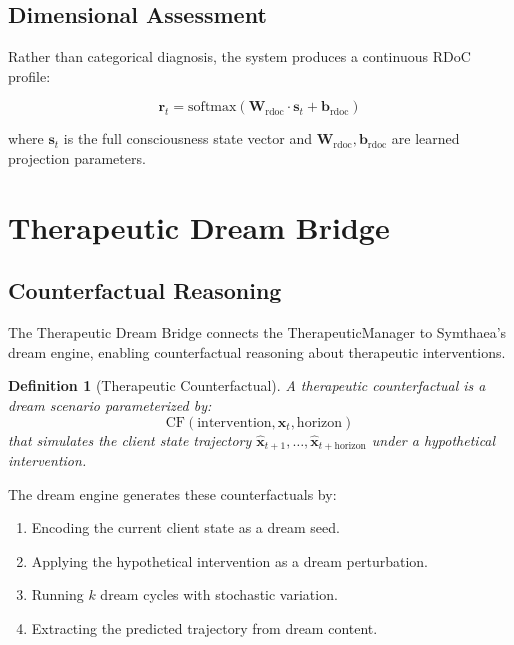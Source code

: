 \documentclass[11pt,a4paper]{article}
\newtheorem{definition}{Definition}
\begin{document}
\subsection{Dimensional Assessment}

Rather than categorical diagnosis, the system produces a continuous RDoC profile:

\begin{equation}
\mathbf{r}_t = \text{softmax}\left(\mathbf{W}_{\text{rdoc}} \cdot \mathbf{s}_t + \mathbf{b}_{\text{rdoc}}\right)
\end{equation}

where $\mathbf{s}_t$ is the full consciousness state vector and $\mathbf{W}_{\text{rdoc}}, \mathbf{b}_{\text{rdoc}}$ are learned projection parameters.

\section{Therapeutic Dream Bridge}

\subsection{Counterfactual Reasoning}

The Therapeutic Dream Bridge connects the TherapeuticManager to Symthaea's dream engine, enabling counterfactual reasoning about therapeutic interventions.

\begin{definition}[Therapeutic Counterfactual]
A therapeutic counterfactual is a dream scenario parameterized by:
\begin{equation}
\text{CF}(\text{intervention}, \mathbf{x}_t, \text{horizon})
\end{equation}
that simulates the client state trajectory $\hat{\mathbf{x}}_{t+1}, \ldots, \hat{\mathbf{x}}_{t+\text{horizon}}$ under a hypothetical intervention.
\end{definition}

The dream engine generates these counterfactuals by:
\begin{enumerate}[nosep]
    \item Encoding the current client state as a dream seed.
    \item Applying the hypothetical intervention as a dream perturbation.
    \item Running $k$ dream cycles with stochastic variation.
    \item Extracting the predicted trajectory from dream content.
\end{enumerate}
\end{document}
